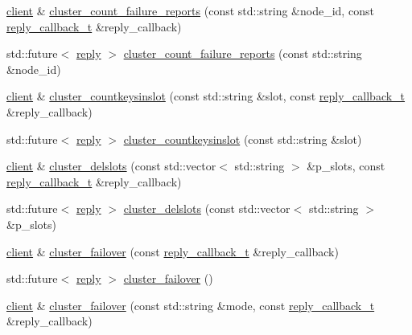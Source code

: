 \begin{DoxyCompactItemize}
\hyperlink{classcpp__redis_1_1client}{client} \& \hyperlink{classcpp__redis_1_1client_a757c2a5c8e5b42ccd3930d89d739f602}{cluster\+\_\+count\+\_\+failure\+\_\+reports} (const std\+::string \&node\+\_\+id, const \hyperlink{classcpp__redis_1_1client_a061a1140d36d2eaeda82b09a0bb3f9f2}{reply\+\_\+callback\+\_\+t} \&reply\+\_\+callback)
\item 
std\+::future$<$ \hyperlink{classcpp__redis_1_1reply}{reply} $>$ \hyperlink{classcpp__redis_1_1client_af1ff307eb9feb58b48b11bda78131a20}{cluster\+\_\+count\+\_\+failure\+\_\+reports} (const std\+::string \&node\+\_\+id)
\item 
\hyperlink{classcpp__redis_1_1client}{client} \& \hyperlink{classcpp__redis_1_1client_a78017860625d016074d0495c24c3f9e8}{cluster\+\_\+countkeysinslot} (const std\+::string \&slot, const \hyperlink{classcpp__redis_1_1client_a061a1140d36d2eaeda82b09a0bb3f9f2}{reply\+\_\+callback\+\_\+t} \&reply\+\_\+callback)
\item 
std\+::future$<$ \hyperlink{classcpp__redis_1_1reply}{reply} $>$ \hyperlink{classcpp__redis_1_1client_a8135eee3cfc95b061aee9b6f7271efce}{cluster\+\_\+countkeysinslot} (const std\+::string \&slot)
\item 
\hyperlink{classcpp__redis_1_1client}{client} \& \hyperlink{classcpp__redis_1_1client_a41f96bb9a627724570f1866d0983d7b2}{cluster\+\_\+delslots} (const std\+::vector$<$ std\+::string $>$ \&p\+\_\+slots, const \hyperlink{classcpp__redis_1_1client_a061a1140d36d2eaeda82b09a0bb3f9f2}{reply\+\_\+callback\+\_\+t} \&reply\+\_\+callback)
\item 
std\+::future$<$ \hyperlink{classcpp__redis_1_1reply}{reply} $>$ \hyperlink{classcpp__redis_1_1client_a6cd07520f60ee78c4603211273adcf46}{cluster\+\_\+delslots} (const std\+::vector$<$ std\+::string $>$ \&p\+\_\+slots)
\item 
\hyperlink{classcpp__redis_1_1client}{client} \& \hyperlink{classcpp__redis_1_1client_a5afcee001e210150803a95c3d6412998}{cluster\+\_\+failover} (const \hyperlink{classcpp__redis_1_1client_a061a1140d36d2eaeda82b09a0bb3f9f2}{reply\+\_\+callback\+\_\+t} \&reply\+\_\+callback)
\item 
std\+::future$<$ \hyperlink{classcpp__redis_1_1reply}{reply} $>$ \hyperlink{classcpp__redis_1_1client_a76122bb138c12b90c78c4e511f45ef17}{cluster\+\_\+failover} ()
\item 
\hyperlink{classcpp__redis_1_1client}{client} \& \hyperlink{classcpp__redis_1_1client_a9c95de64e422c09c2180dc69db386d06}{cluster\+\_\+failover} (const std\+::string \&mode, const \hyperlink{classcpp__redis_1_1client_a061a1140d36d2eaeda82b09a0bb3f9f2}{reply\+\_\+callback\+\_\+t} \&reply\+\_\+callback)

\end{DoxyCompactItemize}
